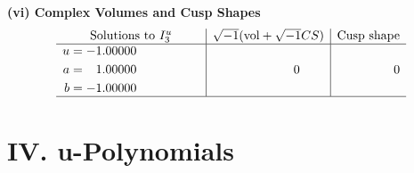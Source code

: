 \documentclass[1p]{elsarticle_modified}
\theoremstyle{definition}
\newcommand{\I}{\sqrt{-1}}
\begin{document}
\newpage\flushleft \textbf{(vi) Complex Volumes and Cusp Shapes}
$$\begin{array}{c|c|c}  
\text{Solutions to }I^u_{3}& \I (\text{vol} + \sqrt{-1}CS) & \text{Cusp shape}\\
 \hline 
\begin{aligned}
u &= -1.00000\phantom{ +0.000000I} \\
a &= \phantom{-}1.00000\phantom{ +0.000000I} \\
b &= -1.00000\phantom{ +0.000000I}\end{aligned}
 & \phantom{-0.000000 } 0 & \phantom{-0.000000 } 0\\
 \hline 
 \end{array}$$\newpage
\newpage\renewcommand{\arraystretch}{1}
\centering \section*{ IV. u-Polynomials}
\end{document}
